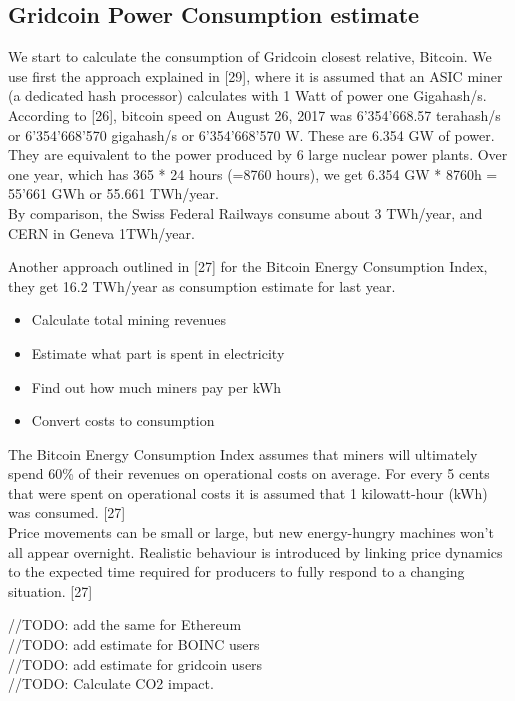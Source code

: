 \subsection{Gridcoin Power Consumption estimate}

We start to calculate the consumption of Gridcoin closest relative, Bitcoin. We use first the approach explained in [29], where it is assumed that an ASIC miner (a dedicated hash processor) calculates with 1 Watt of power one Gigahash/s. According to [26], bitcoin speed on August 26, 2017 was 6'354'668.57 terahash/s or 6'354'668'570 gigahash/s or 6'354'668'570 W. These are 6.354 GW of power. They are equivalent to the power produced by 6 large nuclear power plants. Over one year, which has 365 * 24 hours (=8760 hours), we get 6.354 GW * 8760h = 55'661 GWh or 55.661 TWh/year.\\ 

By comparison, the Swiss Federal Railways consume about 3 TWh/year, and CERN in Geneva 1TWh/year.

Another approach outlined in [27] for the Bitcoin Energy Consumption Index, they get 16.2 TWh/year as consumption estimate for last year.

\begin{itemize}
	\item Calculate total mining revenues
	\item Estimate what part is spent in electricity
	\item Find out how much miners pay per kWh
	\item Convert costs to consumption
\end{itemize}

The Bitcoin Energy Consumption Index assumes that miners will ultimately spend 60\% of their revenues on operational costs on average. For every 5 cents that were spent on operational costs it is assumed that 1 kilowatt-hour (kWh) was consumed. [27]\\

Price movements can be small or large, but new energy-hungry machines won't all appear overnight. Realistic behaviour is introduced by linking price dynamics to the expected time required for producers to fully respond to a changing situation. [27]

//TODO: add the same for Ethereum\\


//TODO: add estimate for BOINC users\\
//TODO: add estimate for gridcoin users\\

//TODO: Calculate CO2 impact. 